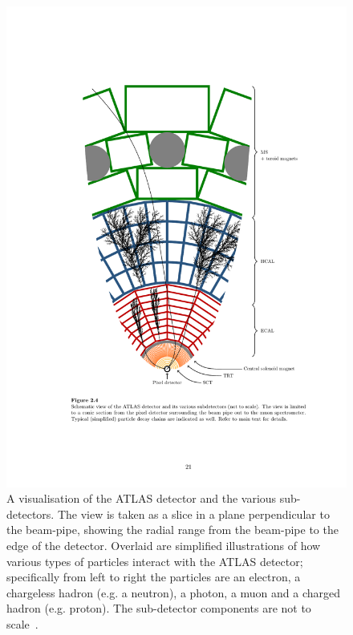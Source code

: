 \begin{figure}[!ht]
  \begin{center}
    \includegraphics[width=1\linewidth, angle=0]{figs/Detector/ATLAS_slice.pdf}
  \end{center}
  \caption[A visualisation of the ATLAS detector and the various sub-detectors.
    The view is taken as a slice in a plane perpendicular to the beam-pipe,
    showing the radial range from the beam-pipe to the edge of the detector.
    Overlaid are simplified illustrations of how various types of particles interact with the ATLAS detector;
    specifically from left to right the particles are an electron, a chargeless hadron (e.g. a neutron), a photon, a muon and a charged hadron (e.g. proton).
    The sub-detector components are not to scale.]
          {A visualisation of the ATLAS detector and the various sub-detectors.
    The view is taken as a slice in a plane perpendicular to the beam-pipe,
    showing the radial range from the beam-pipe to the edge of the detector.
    Overlaid are simplified illustrations of how various types of particles interact with the ATLAS detector;
    specifically from left to right the particles are an electron, a chargeless hadron (e.g. a neutron), a photon, a muon and a charged hadron (e.g. proton).
    The sub-detector components are not to scale~\cite{det-thesis_gutchow}.}
  \label{fig:det-ATLAS_slice}
\end{figure}

